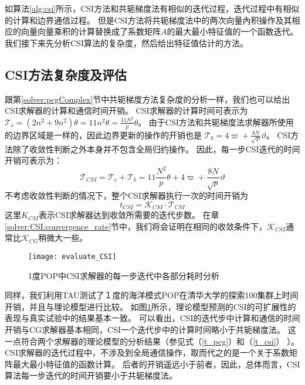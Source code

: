 如算法\ref{alg:csi}所示，CSI方法和共轭梯度法有相似的迭代过程，迭代过程中有相似的计算和边界通信过程。
但是CSI方法将共轭梯度法中的两次向量內积操作及其相应的向量向量乘积的计算替换成了系数矩阵$A$的最大最小特征值的一个函数迭代。 我们接下来先分析CSI算法的复杂度，然后给出特征值估计的方法。

\subsection{CSI方法复杂度及评估} \label{solver:Algorithm:complex}

跟第\ref{solver:pcgComplex}节中共轭梯度方法复杂度的分析一样，我们也可以给出CSI求解器的计算和通信时间开销。
CSI求解器的计算时间可表示为
$\mathcal{T}_c =  (2 n^2 + 9n^2)\theta = 11n^2\theta =\frac{11N^2}{p}\theta$。 
由于CSI方法和共轭梯度法求解器所使用的边界区域是一样的，因此边界更新的操作的开销也是 $\mathcal{T}_b =4\varpi + \frac{8N}{\sqrt{P}}\vartheta$。 CSI方法除了收敛性判断之外本身并不包含全局归约操作。 
因此，每一步CSI迭代的时间开销可表示为： 　
\begin{equation}
\label{t_csi}
\mathcal{T}_{CSI} = \mathcal{T}_c + \mathcal{T}_b
= 11\frac{N^2}{p}\theta + 4\varpi + \frac{8N}{\sqrt{p}}\vartheta
\end{equation}
不考虑收敛性判断的情况下，整个CSI求解器执行一次的时间开销为
\begin{equation}
\label{t_csi_all}
t_{CSI} = \mathcal{K}_{CSI}\cdot \mathcal{T}_{CSI}
\end{equation}
这里$K_{CSI}$表示CSI求解器达到收敛所需要的迭代步数。
在章\ref{solver:CSI:convergence_rate}节中，我们将会证明在相同的收敛条件下，$\mathcal{K}_{CSI}$通常比$\mathcal{K}_{CG}$稍微大一些。



\begin {figure}%
\centering
\texttt{[image: evaluate\_CSI]}
\caption[] { 1度POP中CSI求解器的每一步迭代中各部分耗时分析}
\label{fig:cst_ratio}
\end{figure}
同样，我们利用TAU测试了１度的海洋模式POP在清华大学的探索100集群上时间开销，并且与理论模型进行比较。
如图\ref{fig:cst_ratio}所示，理论模型预测的CSI的可扩展性的表现与真实试验中的结果基本一致。
可以看出，CSI的迭代步中计算和通信的时间开销与CG求解器基本相同，CSI一个迭代步中的计算时间略小于共轭梯度法。
这一点符合两个求解器的理论模型的分析结果（参见式（\ref{t_pcg}）和（\ref{t_csi}） ）。
CSI求解器的迭代过程中，不涉及到全局通信操作，取而代之的是一个关于系数矩阵最大最小特征值的函数计算。
后者的开销遥远小于前者，因此，总体而言，CSI算法每一步迭代的时间开销要小于共轭梯度法。 

